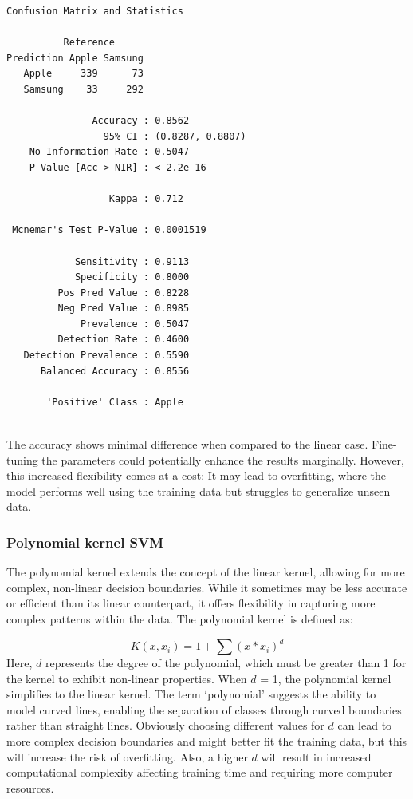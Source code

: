 \begin{verbatim}
Confusion Matrix and Statistics

          Reference
Prediction Apple Samsung
   Apple     339      73
   Samsung    33     292
                                          
               Accuracy : 0.8562          
                 95% CI : (0.8287, 0.8807)
    No Information Rate : 0.5047          
    P-Value [Acc > NIR] : < 2.2e-16       
                                          
                  Kappa : 0.712           
                                          
 Mcnemar's Test P-Value : 0.0001519       
                                          
            Sensitivity : 0.9113          
            Specificity : 0.8000          
         Pos Pred Value : 0.8228          
         Neg Pred Value : 0.8985          
             Prevalence : 0.5047          
         Detection Rate : 0.4600          
   Detection Prevalence : 0.5590          
      Balanced Accuracy : 0.8556          
                                          
       'Positive' Class : Apple           
                                          
\end{verbatim}

The accuracy shows minimal difference when compared to the linear
case. Fine-tuning the parameters could potentially enhance the results
marginally. However, this increased flexibility comes at a cost: It may
lead to overfitting, where the model performs well using the training data
but struggles to generalize unseen data.

\subsubsection{Polynomial kernel SVM}\label{polynomial-kernel-svm}

The polynomial kernel extends the concept of the linear kernel, allowing
for more complex, non-linear decision boundaries. While it sometimes may
be less accurate or efficient than its linear counterpart, it
offers flexibility in capturing more complex patterns within the data.
The polynomial kernel is defined as:

\[K(x, x_i)=1+\sum(x*x_i)^d \] Here, \(d\) represents the degree of the
polynomial, which must be greater than 1 for the kernel to exhibit
non-linear properties. When \(d\) = 1, the polynomial kernel simplifies
to the linear kernel. The term `polynomial' suggests the ability to
model curved lines, enabling the separation of classes through curved
boundaries rather than straight lines. Obviously choosing different
values for \(d\) can lead to more complex decision boundaries and might
better fit the training data, but this will increase the risk of
overfitting. Also, a higher \(d\) will result in increased
computational complexity affecting training time and requiring more
computer resources.

